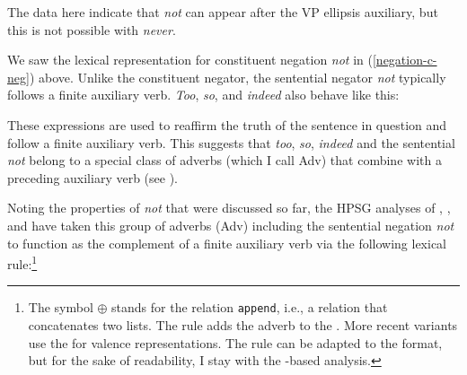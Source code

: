 \documentclass[output=paper,biblatex,babelshorthands,newtxmath,draftmode,colorlinks,citecolor=brown]{langscibook}
\begin{document}
\begin{exe}
\begin{xlist}
\begin{exe}
\begin{xlist}
\eal
\label{negation-vpe-not-ex}
\zl
%
\noindent The data here indicate that \textit{not} can appear
after the VP ellipsis auxiliary, but this is not possible with
\emph{never}.

\largerpage
We saw the lexical representation for constituent negation \textit{not} in (\ref{negation-c-neg})
above. Unlike the constituent negator, the sentential negator \textit{not} typically follows a
finite auxiliary verb. \textit{Too}, \textit{so}, and \textit{indeed} also behave like this: 

\eal
{} 
\zl

\noindent
These expressions are used to
reaffirm the truth of the sentence in question and
follow a finite auxiliary verb. This suggests that \emph{too}, \emph{so}, \emph{indeed} and the sentential \emph{not} belong to
a special class of adverbs (which I call Adv) that combine with a
preceding auxiliary verb (see \citealt[--95]{Kim:00}).

Noting the properties of \emph{not} that were discussed so far,
the HPSG analyses of \citet{AG:97}, \citet[Section~3.4]{Kim:00}, and \citet{Warner2000a-u}
have taken this group of adverbs (Adv) including the sentential negation \emph{not}
to function as the complement of a finite auxiliary verb via the following lexical
rule:\footnote{The symbol $\oplus$ stands for the relation \texttt{append}, i.e., a relation
  that concatenates two lists. The rule adds the adverb to the \compsl. More recent variants
    use the \argstl for valence representations. The rule can be adapted to the \argst format, but
    for the sake of readability, I stay with the \comps-based analysis.}


\end{xlist}
\end{exe}
\end{xlist}
\end{exe}
\end{document}
